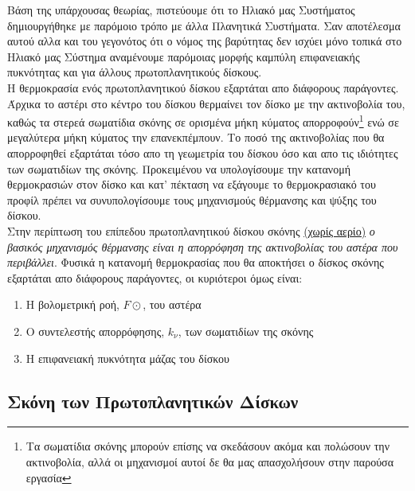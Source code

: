 Βάση της υπάρχουσας θεωρίας, πιστεύουμε ότι το Ηλιακό μας Συστήματος δημιουργήθηκε με παρόμοιο τρόπο με άλλα Πλανητικά Συστήματα. Σαν αποτέλεσμα αυτού αλλα και του γεγονότος ότι ο νόμος της βαρύτητας δεν ισχύει μόνο τοπικά στο Ηλιακό μας Σύστημα αναμένουμε παρόμοιας μορφής καμπύλη επιφανειακής πυκνότητας και για άλλους πρωτοπλανητικούς δίσκους.\\
   
Η θερμοκρασία ενός πρωτοπλανητικού δίσκου εξαρτάται απο διάφορους παράγοντες. Άρχικα το αστέρι στο κέντρο του δίσκου θερμαίνει τον δίσκο με την ακτινοβολία του, καθώς τα στερεά σωματίδια σκόνης σε ορισμένα μήκη κύματος απορροφούν\footnote{Τα σωματίδια σκόνης μπορούν επίσης να σκεδάσουν ακόμα και πολώσουν την ακτινοβολία, αλλά οι μηχανισμοί αυτοί δε θα μας απασχολήσουν στην παρούσα εργασία} ενώ σε μεγαλύτερα μήκη κύματος την επανεκπέμπουν. Το ποσό της ακτινοβολίας που θα απορροφηθεί εξαρτάται τόσο απο τη γεωμετρία του δίσκου όσο και απο τις ιδιότητες των σωματιδίων της σκόνης.
Προκειμένου να υπολογίσουμε την κατανομή θερμοκρασιών στον δίσκο και κατ' πέκταση να εξάγουμε το θερμοκρασιακό του προφίλ πρέπει να συνυπολογίσουμε τους μηχανισμούς θέρμανσης και ψύξης του δίσκου.\\   

Στην περίπτωση του επίπεδου πρωτοπλανητικού δίσκου σκόνης \underline{(χωρίς αερίο)} {\it ο βασικός μηχανισμός θέρμανσης είναι η απορρόφηση της ακτινοβολίας του αστέρα που περιβάλλει}. 
Φυσικά η κατανομή θερμοκρασίας που θα αποκτήσει ο δίσκος σκόνης εξαρτάται απο διάφορους παράγοντες, οι κυριότεροι όμως είναι:
 
   \begin{enumerate}
      \item H βολομετρική ροή, $F\odot$, του αστέρα
      \item O συντελεστής απορρόφησης, $k_\nu$, των σωματιδίων της σκόνης
      \item Η επιφανειακή πυκνότητα μάζας του δίσκου     
   \end{enumerate}
   
\subsection{Σκόνη των Πρωτοπλανητικών Δίσκων}

